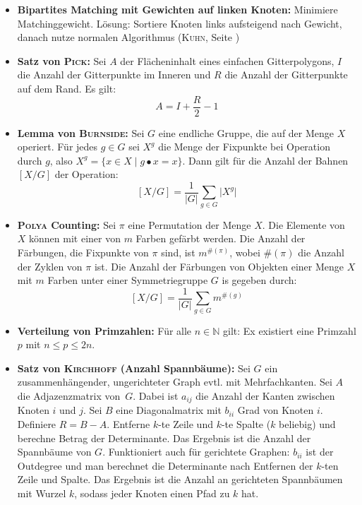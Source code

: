 \begin{itemize}
	\item \textbf{Bipartites Matching mit Gewichten auf linken Knoten:}
	Minimiere Matchinggewicht.
	Lösung: Sortiere Knoten links aufsteigend nach Gewicht, danach nutze normalen Algorithmus (\textsc{Kuhn}, Seite \pageref{kuhn})

	\item \textbf{Satz von \textsc{Pick}:}
	Sei $A$ der Flächeninhalt eines einfachen Gitterpolygons, $I$ die Anzahl der Gitterpunkte im Inneren und $R$ die Anzahl der Gitterpunkte auf dem Rand.
	Es gilt:\vspace*{-\baselineskip}
	\[
		A = I + \frac{R}{2} - 1
	\]

	\item \textbf{Lemma von \textsc{Burnside}:}
	Sei $G$ eine endliche Gruppe, die auf der Menge $X$ operiert.
	Für jedes $g \in G$ sei $X^g$ die Menge der Fixpunkte bei Operation durch $g$, also $X^g = \{x \in X \mid g \bullet x = x\}$.
	Dann gilt für die Anzahl der Bahnen $[X/G]$ der Operation:
	\[
		[X/G] = \frac{1}{\vert G \vert} \sum_{g \in G} \vert X^g \vert
	\]

	\item \textbf{\textsc{Polya} Counting:}
	Sei $\pi$ eine Permutation der Menge $X$.
	Die Elemente von $X$ können mit einer von $m$ Farben gefärbt werden.
	Die Anzahl der Färbungen, die Fixpunkte von $\pi$ sind, ist $m^{\#(\pi)}$, wobei $\#(\pi)$ die Anzahl der Zyklen von $\pi$ ist.
	Die Anzahl der Färbungen von Objekten einer Menge $X$ mit $m$ Farben unter einer Symmetriegruppe $G$ is gegeben durch:
	\[
		[X/G] = \frac{1}{\vert G \vert} \sum_{g \in G} m^{\#(g)}
	\]

	\item \textbf{Verteilung von Primzahlen:}
	Für alle $n \in \mathbb{N}$ gilt: Ex existiert eine Primzahl $p$ mit $n \leq p \leq 2n$.

	\item \textbf{Satz von \textsc{Kirchhoff} (Anzahl Spannbäume):}
	Sei $G$ ein zusammenhängender, ungerichteter Graph evtl. mit Mehrfachkanten.
	Sei $A$ die Adjazenzmatrix von~$G$.
	Dabei ist $a_{ij}$ die Anzahl der Kanten zwischen Knoten $i$ und $j$.
	Sei $B$ eine Diagonalmatrix mit $b_{ii}$ Grad von Knoten $i$.
	Definiere $R = B - A$.
	Entferne $k$-te Zeile und $k$-te Spalte ($k$ beliebig) und berechne Betrag der Determinante.
	Das Ergebnis ist die Anzahl der Spannbäume von $G$.
	\newline
	Funktioniert auch für gerichtete Graphen: $b_{ii}$ ist der Outdegree und man
	berechnet die Determinante nach Entfernen der $k$-ten Zeile und Spalte.
	Das Ergebnis ist die Anzahl an gerichteten Spannbäumen mit Wurzel $k$,
	sodass jeder Knoten einen Pfad zu $k$ hat.


\end{itemize}
